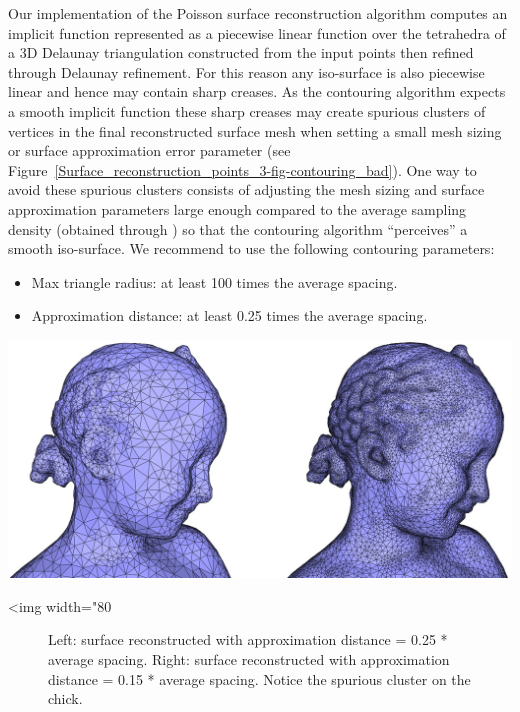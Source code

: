 Our implementation of the Poisson surface reconstruction algorithm computes an implicit function represented as a piecewise linear function over the tetrahedra of a 3D Delaunay triangulation constructed from the input points then refined through Delaunay refinement. For this reason any iso-surface is also piecewise linear and hence may contain sharp creases. As the contouring algorithm  expects a smooth implicit function these sharp creases may create spurious clusters of vertices in the final reconstructed surface mesh when setting a small mesh sizing or surface approximation error parameter (see Figure~\ref{Surface_reconstruction_points_3-fig-contouring_bad}). One way to avoid these spurious clusters consists of adjusting the mesh sizing and surface approximation parameters large enough compared to the average sampling density (obtained through ) so that the contouring algorithm ``perceives'' a smooth iso-surface. We recommend to use the following contouring parameters:
\begin{itemize}
\item Max triangle radius: at least 100 times the average spacing.
\item Approximation distance: at least 0.25 times the average spacing.
\end{itemize}

\begin{center}
    \label{Surface_reconstruction_points_3-fig-contouring_bad}
    \begin{ccTexOnly}
\includegraphics[width=1.0\textwidth]{Surface_reconstruction_points_3/contouring_bad}
    \end{ccTexOnly}
    \begin{ccHtmlOnly}
        <img width="80%
    \end{ccHtmlOnly}
    \begin{figure}[h]
        \caption{Left: surface reconstructed with approximation
                 distance = 0.25 * average spacing.
                 Right: surface reconstructed with approximation
                 distance = 0.15 * average spacing.
                 Notice the spurious cluster on the chick.}
    \end{figure}
\end{center}


